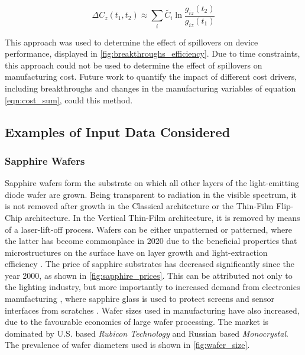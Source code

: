\documentclass[10pt]{article}
\begin{document}
\begin{equation}
\Delta C_z (t_1,t_2) \approx \sum_i \tilde{C_i} \ln \frac{g_{iz}(t_2)}{g_{iz}(t_1)}
\end{equation}

This approach was used to determine the effect of spillovers on device performance, displayed in  \cref{fig:breakthroughs_efficiency}. Due to time constraints, this approach could not be used to determine the effect of spillovers on manufacturing cost. Future work to quantify the impact of different cost drivers, including breakthroughs and changes in the manufacturing variables of equation \cref{eqn:cost_sum}, could this method.

\subsection{Examples of Input Data Considered}

\subsubsection{Sapphire Wafers}

Sapphire wafers form the substrate on which all other layers of the light-emitting diode wafer are grown. Being transparent to radiation in the visible spectrum, it is not removed after growth in the Classical architecture or the Thin-Film Flip-Chip architecture. In the Vertical Thin-Film architecture, it is removed by means of a laser-lift-off process. Wafers can be either unpatterned or patterned, where the latter has become commonplace in 2020 due to the beneficial properties that microstructures on the surface have on layer growth \cite{wuu2009defect} and light-extraction efficiency \cite{lee2006enhancing}. The price of sapphire substrates has decreased significantly since the year 2000, as shown in  \cref{fig:sapphire_prices}. This can be attributed not only to the lighting industry, but more importantly to increased demand from electronics manufacturing \cite{yole2015sapphire}, where sapphire glass is used to protect screens and sensor interfaces from scratches \cite{khattak2016world}. Wafer sizes used in manufacturing have also increased, due to the favourable economics of large wafer processing. The market is dominated by U.S. based \textit{Rubicon Technology} and Russian based \textit{Monocrystal}. The prevalence of wafer diameters used is shown in  \cref{fig:wafer_size}.
\end{document}
